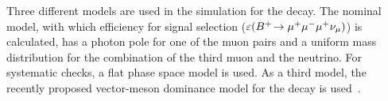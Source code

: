 Three different models are used in the simulation for the \Bmumumu decay. The nominal model, with which efficiency for signal selection ($\varepsilon({{{B}^+}}\!\rightarrow {\ensuremath{\mu^+}}{\ensuremath{\mu^-}}{\ensuremath{\mu^+}}{\ensuremath{{\nu}_\mu}})$) is calculated, has a photon pole for one of the muon pairs and a uniform mass distribution for the combination of the third muon and the neutrino. For systematic checks, a flat phase space model is used. As a third model, the recently proposed vector-meson dominance model for the decay is used~\cite{Danilina:2018uzr}. 
